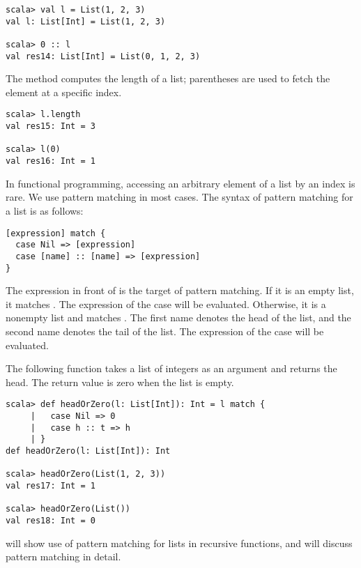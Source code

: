 \begin{verbatim}
scala> val l = List(1, 2, 3)
val l: List[Int] = List(1, 2, 3)

scala> 0 :: l
val res14: List[Int] = List(0, 1, 2, 3)
\end{verbatim}

The  method computes the length of a list; parentheses are used
to fetch the element at a specific index.

\begin{verbatim}
scala> l.length
val res15: Int = 3

scala> l(0)
val res16: Int = 1
\end{verbatim}

In functional programming, accessing an arbitrary element of a list by an index
is rare. We use pattern matching in most cases. The syntax of pattern matching
for a list is as follows:

\begin{verbatim}
[expression] match {
  case Nil => [expression]
  case [name] :: [name] => [expression]
}
\end{verbatim}

The expression in front of  is the target of pattern matching.
If it is an empty list, it matches . The expression
of the  case will be evaluated.
Otherwise, it is a nonempty list and matches . The first
name denotes the head of the list, and the second
name denotes the tail of the list. The expression of the \code{::} case will be evaluated.

The following function takes a list of integers as an argument and returns the
head. The return value is zero when the list is empty.

\begin{verbatim}
scala> def headOrZero(l: List[Int]): Int = l match {
     |   case Nil => 0
     |   case h :: t => h
     | }
def headOrZero(l: List[Int]): Int

scala> headOrZero(List(1, 2, 3))
val res17: Int = 1

scala> headOrZero(List())
val res18: Int = 0
\end{verbatim}

 will show use of pattern matching for lists in recursive
functions, and  will discuss pattern matching in detail.

